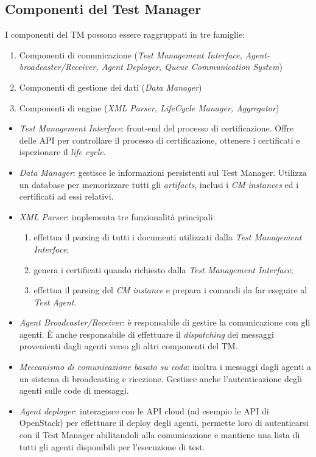 \documentclass[../main.tex]{subfiles}
\begin{document}
\subsection{Componenti del Test Manager}
I componenti del TM possono essere raggruppati in tre famiglie:
\begin{enumerate}
\item Componenti di comunicazione (\textit{Test Management Interface, Agent-broadcaster/Receiver, Agent Deployer, Queue Communication System})
\item Componenti di gestione dei dati (\textit{Data Manager})
\item Componenti di engine (\textit{XML Parser, LifeCycle Manager, Aggregator})
\end{enumerate}
\begin{itemize}
\item \textit{Test Management Interface}: front-end del processo di certificazione. Offre delle API per controllare il processo di certificazione, ottenere i certificati e ispezionare il \textit{life cycle}.
\item \textit{Data Manager}: gestisce le informazioni persistenti sul Test Manager. Utilizza un database per memorizzare tutti gli \textit{artifacts}, inclusi i \textit{CM instances} ed i certificati ad essi relativi.
\item \textit{XML Parser}: implementa tre funzionalità principali:
\begin{enumerate}
\item effettua il parsing di tutti i documenti utilizzati dalla \textit{Test Management Interface};
\item genera i certificati quando richiesto dalla \textit{Test Management Interface};
\item effettua il parsing del \textit{CM instance} e prepara i comandi da far eseguire al \textit{Test Agent}.
\end{enumerate}
\item \textit{Agent Broadcaster/Receiver}: è responsabile di gestire la comunicazione con gli agenti. \`E anche responsabile di effettuare il \textit{dispatching} dei messaggi provenienti dagli agenti verso gli altri componenti del TM. 
\item \textit{Meccanismo di comunicazione basato su coda}: inoltra i messaggi dagli agenti a un sistema di broadcasting e ricezione. Gestisce anche l'autenticazione degli agenti sulle code di messaggi.
\item \textit{Agent deployer}: interagisce con le API cloud (ad esempio le API di OpenStack) per effettuare il deploy degli agenti, permette loro di autenticarsi con il Test Manager abilitandoli alla comunicazione e mantiene una lista di tutti gli agenti disponibili per l'esecuzione di test.

\end{itemize}
\end{document}
